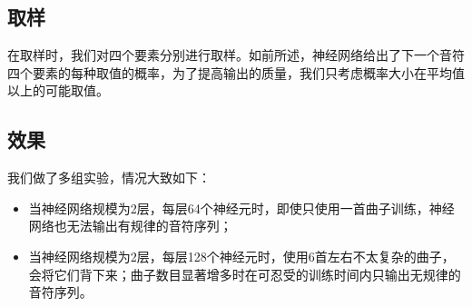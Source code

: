 \documentclass{article}
\begin{document}
  \subsection{取样}
    在取样时，我们对四个要素分别进行取样。如前所述，神经网络给出了下一个音符四个要素的每种取值的概率，为了提高输出的质量，我们只考虑概率大小在平均值以上的可能取值。
  \subsection{效果}
    我们做了多组实验，情况大致如下：
    \begin{itemize}
    \item 当神经网络规模为2层，每层64个神经元时，即使只使用一首曲子训练，神经网络也无法输出有规律的音符序列；
    \item 当神经网络规模为2层，每层128个神经元时，使用6首左右不太复杂的曲子，会将它们背下来；曲子数目显著增多时在可忍受的训练时间内只输出无规律的音符序列。
    \end{itemize}
\end{document}
